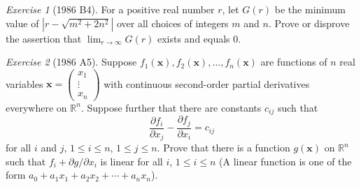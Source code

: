 \documentclass{article}
\theoremstyle{definition}
\theoremstyle{remark}
\newtheorem{exercise}{Exercise}
\newcommand{\RR}{\mathbb{R}}
\begin{document}
\begin{exercise}[1986 B4]
For a positive real number $r$, let $G(r)$ be the minimum value of $\left|r-\sqrt{m^2+2n^2}\right|$ over all choices of integers $m$ and $n$. Prove or disprove the assertion that $\lim_{r\to\infty} G(r)$ exists and equals $0$.
\end{exercise}

\begin{exercise}[1986 A5] 
Suppose $f_1(\mathbf{x}),f_2(\mathbf{x}),\dots,f_n(\mathbf{x})$ are functions of $n$ real variables $\mathbf{x}=\begin{pmatrix}x_1 \\ \vdots \\ x_n\end{pmatrix}$ with continuous second-order partial derivatives everywhere on $\RR^n$. Suppose further that there are constants $c_{ij}$ such that
\[\frac{\partial f_i}{\partial x_j}-\frac{\partial f_j}{\partial x_i} = c_{ij}\] for all $i$ and $j$, $1\leq i \leq n$, $1\leq j \leq n$. Prove that there is a function $g(\mathbf{x})$ on $\RR^n$ such that $f_i+\partial g/\partial x_i$ is linear for all $i$, $1\leq i \leq n$ (A linear function is one of the form $a_0+a_1x_1+a_2x_2+\cdots +a_nx_n$).
\end{exercise}
\end{document}
